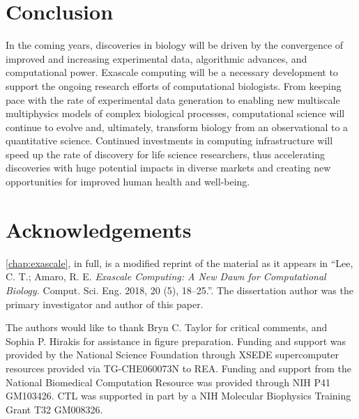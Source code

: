 \section{Conclusion}

\par In the coming years, discoveries in biology will be driven by the convergence of improved and increasing experimental data, algorithmic advances, and computational power. Exascale computing will be a necessary development to support the ongoing research efforts of computational biologists. From keeping pace with the rate of experimental data generation to enabling new multiscale multiphysics models of complex biological processes, computational science will continue to evolve and, ultimately, transform biology from an observational to a quantitative science. Continued investments in computing infrastructure will speed up the rate of discovery for life science researchers, thus accelerating discoveries with huge potential impacts in diverse markets and creating new opportunities for improved human health and well-being.

\section{Acknowledgements}
\par \cref{chap:exascale}, in full, is a modified reprint of the material as it appears in ``Lee, C. T.; Amaro, R. E. \emph{Exascale Computing: A New Dawn for Computational Biology.} Comput. Sci. Eng. 2018, 20 (5), 18–25.''.
The dissertation author was the primary investigator and author of this paper.

\par The authors would like to thank Bryn C. Taylor for critical comments, and Sophia P. Hirakis for assistance in figure preparation. Funding and support was provided by the National Science Foundation through XSEDE supercomputer resources provided via TG-CHE060073N to REA. Funding and support from the National Biomedical Computation Resource was provided through NIH P41 GM103426. CTL was supported in part by a NIH Molecular Biophysics Training Grant T32 GM008326.
